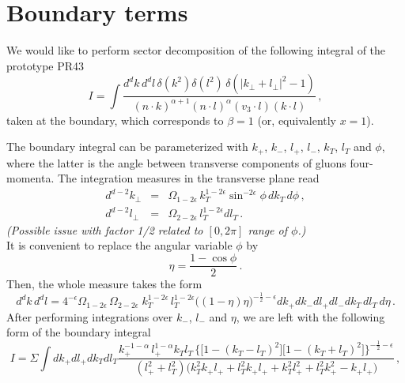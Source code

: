 \documentclass[a4paper,11pt]{report}
\numberwithin{equation}{section}
\newcommand{\smallcomment}[1]{{\small \it (#1)}}
\begin{document}
\newpage
\section{Boundary terms}

We would like to perform sector decomposition of the following integral
of the prototype PR43
%
\begin{equation}
  I = 
  \int \frac{d^d k\, d^d l\, \delta(k^2) \delta(l^2)\,
             \delta(|k_\perp+l_\perp|^2-1)}
  {(n\cdot k)^{\alpha+1} (n\cdot l)^\alpha (v_3 \cdot l) (k\cdot l)}\,,
\end{equation}
%
taken at the boundary, which corresponds to $\beta=1$ (or, equivalently $x=1$).

The boundary integral can be parameterized with $k_+$, $k_-$, $l_+$, $l_-$,
$k_T$, $l_T$ and $\phi$, where the latter is the angle between transverse
components of gluons four-momenta. The integration measures in the transverse
plane read
%
\begin{eqnarray}
  d^{d-2} k_\perp & = & 
  \Omega_{1-2\epsilon}\,
  k_T^{1-2\epsilon} \sin^{-2\epsilon}\! \phi\, d k_T\, d\phi\,,
  \\
  d^{d-2} l_\perp & = & 
  \Omega_{2-2\epsilon}\,
  l_T^{1-2\epsilon} d l_T\,.
\end{eqnarray}
%
\smallcomment{Possible issue with factor 1/2 related to $[0,2\pi]$ range of
$\phi$.}\\
%
It is convenient to replace the angular variable $\phi$ by
%
\begin{equation}
  \eta = \frac{1-\cos\phi}{2}\,.
\end{equation}
%
Then, the whole measure takes the form
%
\begin{equation}
  d^d k\, d^d l =
  4^{-\epsilon}
  \Omega_{1-2\epsilon}\,
  \Omega_{2-2\epsilon}\;
  k_T^{1-2\epsilon} \,
  l_T^{1-2\epsilon} 
  \big((1-\eta)\eta \big)^{-\frac12-\epsilon}
  dk_+ dk_- dl_+ dl_-
  d k_T\, 
  d l_T\,
  d\eta\,.
\end{equation}
%
After performing integrations over $k_-$, $l_-$ and $\eta$, we are left with
the following form of the boundary integral
%
\begin{equation}
  I =
  \Sigma
  \int dk_+ dl_+ dk_T dl_T
  \frac{k_+^{-1-\alpha}\, l_+^{1-\alpha} k_T l_T \,
  \Big\{\big[1-(k_T-l_T)^2\big]\big[1-(k_T+l_T)^2\big]
  \Big\}^{-\frac12-\epsilon}
  }{(l_+^2+l_T^2)
  \big(k_T^2 k_+ l_+ +l_T^2 k_+ l_+ + k_T^2 l_+^2 + l_T^2 k_+^2 - k_+ l_+
  \big)
  }\,,
\end{equation}
\end{document}
